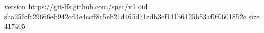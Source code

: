 version https://git-lfs.github.com/spec/v1
oid sha256:fc29666eb942cd3e4ccff8c5eb21d465d71edb3ef141b6125b53af0f0601852c
size 417405
